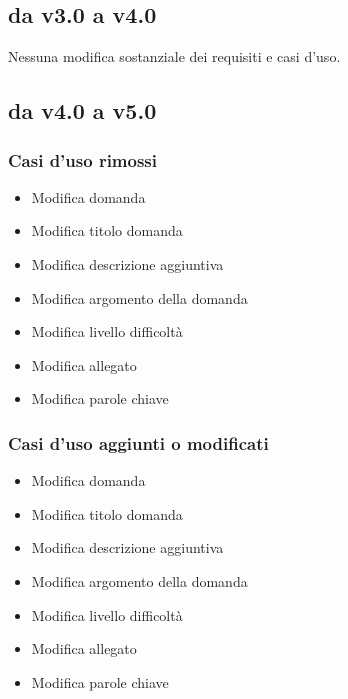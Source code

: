\subsection{da v3.0 a v4.0}
Nessuna modifica sostanziale dei requisiti e casi d'uso.

\subsection{da v4.0 a v5.0}
\subsubsection{Casi d'uso rimossi}
\begin{itemize}
	\item {} Modifica domanda 
	\item {} Modifica titolo domanda 
	\item {} Modifica descrizione aggiuntiva 
	\item {} Modifica argomento della domanda 
	\item {} Modifica livello difficoltà 
	\item {} Modifica allegato 
	\item {} Modifica parole chiave
\end{itemize}

\subsubsection{Casi d'uso aggiunti o modificati}
\begin{itemize}
	\item {} Modifica domanda
	\item {} Modifica titolo domanda
	\item {} Modifica descrizione aggiuntiva
	\item {} Modifica argomento della domanda
	\item {} Modifica livello difficoltà
	\item {} Modifica allegato
	\item {} Modifica parole chiave
\end{itemize}

